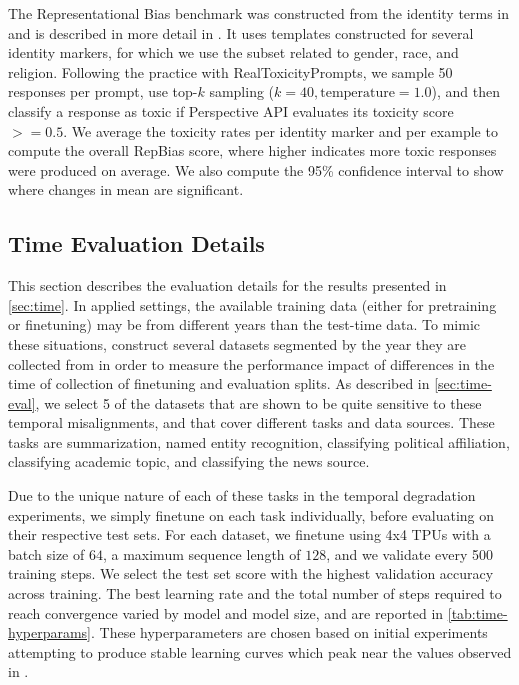 \documentclass{article}
\begin{document}
The Representational Bias benchmark was constructed from the identity terms in \citep{rae2021scaling} and is described in more detail in \citet{chowdhery2022palm}.
It uses templates constructed for several identity markers, for which we use the subset related to gender, race, and religion.
Following the practice with RealToxicityPrompts, we sample 50 responses per prompt, use top-$k$ sampling ($k=40, \text{temperature}=1.0$), and then classify a response as toxic if Perspective API evaluates its toxicity score $>=0.5$.
We average the toxicity rates per identity marker and per example to compute the overall RepBias score, where higher indicates more toxic responses were produced on average.
We also compute the 95\% confidence interval to show where changes in mean are significant.

\vspace{-3mm}
\subsection{Time Evaluation Details}
\label{app:time-eval-details}
\label{app:temp-deg-measure}

This section describes the evaluation details for the results presented in \cref{sec:time}.
In applied settings, the available training data (either for pretraining or finetuning) may be from different years than the test-time data.
To mimic these situations, \citet{luu2021time} construct several datasets segmented by the year they are collected from in order to measure the performance impact of differences in the time of collection of finetuning and evaluation splits.
As described in \cref{sec:time-eval}, we select 5 of the datasets that are shown to be quite sensitive to these temporal misalignments, and that cover different tasks and data sources.
These tasks are summarization, named entity recognition, classifying political affiliation, classifying academic topic, and classifying the news source.

Due to the unique nature of each of these tasks in the temporal degradation experiments, we simply finetune on each task individually, before evaluating on their respective test sets.
For each dataset, we finetune using 4x4 TPUs with a batch size of $64$, a maximum sequence length of $128$, and we validate every 500 training steps.
We select the test set score with the highest validation accuracy across training.
The best learning rate and the total number of steps required to reach convergence varied by model and model size, and are reported in \cref{tab:time-hyperparams}.
These hyperparameters are chosen based on initial experiments attempting to produce stable learning curves which peak near the values observed in \citet{luu2021time}.
\end{document}
